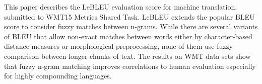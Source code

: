 This paper describes the LeBLEU evaluation score for machine translation, submitted to WMT15 Metrics Shared Task. LeBLEU extends the popular BLEU score to consider fuzzy matches between n-grams. While there are several variants of BLEU that allow non-exact matches between words either by character-based distance measures or morphological preprocessing, none of them use fuzzy comparison between longer chunks of text. The results on WMT data sets show that fuzzy n-gram matching improves correlations to human evaluation especially for highly compounding languages.
